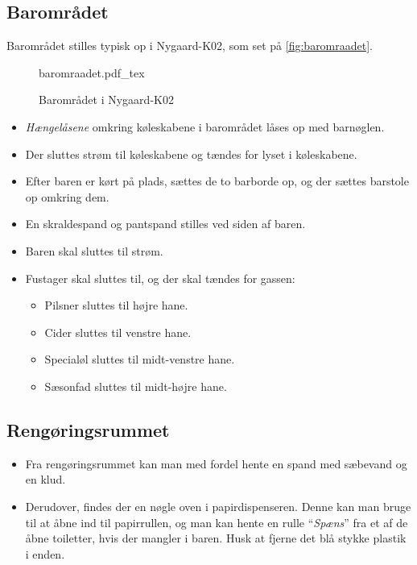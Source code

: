 \subsection{Barområdet}
\label{sec:pre:baromradet}

Barområdet stilles typisk op i Nygaard-K02, som set på \autoref{fig:baromraadet}.

\begin{figure}[t]
	\centering
	\def\svgwidth{\columnwidth}
	{\small{baromraadet.pdf_tex}}
	\caption{Barområdet i Nygaard-K02}
	\label{fig:baromraadet}
\end{figure}

\begin{itemize}
    \item \textit{Hængelåsene} omkring køleskabene i barområdet låses op med barnøglen.
	\item Der sluttes strøm til køleskabene og tændes for lyset i køleskabene.
	\item Efter baren er kørt på plads, sættes de to barborde op, og der sættes barstole op omkring dem.
	\item En skraldespand og pantspand stilles ved siden af baren.
	\item Baren skal sluttes til strøm.
	\item Fustager skal sluttes til, og der skal tændes for gassen:
	\begin{itemize}
		\item Pilsner sluttes til højre hane.
		\item Cider sluttes til venstre hane.
		\item Specialøl sluttes til midt-venstre hane.
		\item Sæsonfad sluttes til midt-højre hane.
	\end{itemize}
\end{itemize}

\subsection{Rengøringsrummet}
\label{sec:pre:rengøring}

\begin{itemize}
	\item Fra rengøringsrummet kan man med fordel hente en spand med sæbevand og en klud.
	\item Derudover, findes der en nøgle oven i papirdispenseren. Denne kan man bruge til
	at åbne ind til papirrullen, og man kan hente en rulle ``\textit{Spæns}''
	fra et af de åbne toiletter, hvis der mangler i baren. 
	Husk at fjerne det blå stykke plastik i enden.
\end{itemize}
